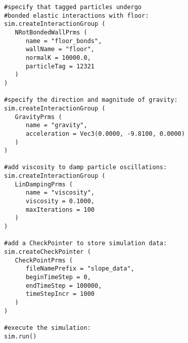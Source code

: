 \begin{verbatim}
#specify that tagged particles undergo 
#bonded elastic interactions with floor:
sim.createInteractionGroup (
   NRotBondedWallPrms (
      name = "floor_bonds",
      wallName = "floor",
      normalK = 10000.0,
      particleTag = 12321
   )
)

#specify the direction and magnitude of gravity:
sim.createInteractionGroup (
   GravityPrms (
      name = "gravity",
      acceleration = Vec3(0.0000, -9.8100, 0.0000)
   )
)

#add viscosity to damp particle oscillations:
sim.createInteractionGroup (
   LinDampingPrms (
      name = "viscosity",
      viscosity = 0.1000,
      maxIterations = 100
   )
)

#add a CheckPointer to store simulation data:
sim.createCheckPointer (
   CheckPointPrms (
      fileNamePrefix = "slope_data",
      beginTimeStep = 0,
      endTimeStep = 100000,
      timeStepIncr = 1000
   )
)

#execute the simulation:
sim.run()
\end{verbatim}


